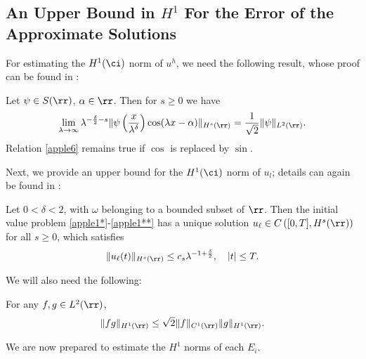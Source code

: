 				 \subsection{An Upper Bound in $H^1$ For the Error of the Approximate
				 Solutions}
         For estimating the $H^1(\ci)$ norm of $u^h$, we need the
				 following result, whose proof can be found in
         \cite{Himonas:2009fk}:
				  \begin{lemma}
					 \label{applea}
					 Let $\psi \in S(\rr)$, $\alpha \in \rr$. Then for $s \ge 0$ we have
					 \begin{equation}
						 \begin{split}
							 \lim_{\lambda \to \infty} \lambda^{-\frac{\delta}{2}-s}
							 \|\psi \left( \frac{x}{\lambda^\delta} \right)\cos(\lambda
							 x - \alpha) \|_{H^s(\rr)} = \frac{1}{\sqrt
							 2}\|\psi\|_{L^2(\rr)}.
							 \label{apple6}
						 \end{split}
					 \end{equation}
					 Relation \eqref{apple6} remains true if $\cos$ is
					 replaced by $\sin$.
				 \end{lemma}
				 Next, we provide an upper bound for the $H^1(\ci)$ norm of
				 $u_l$; details can again be found in
         \cite{Himonas:2009fk}:
				\begin{lemma}
					\label{appleb}
					Let $0<\delta<2$, with $\omega$ belonging to a bounded
					subset of $\rr$. Then the initial value problem
					\eqref{apple1*}-\eqref{apple1**} has a unique solution
					$u_\ell \in C\left( [0,T], H^s(\rr) \right)$ for all $s
					\ge 0$, which 
					satisfies
					\begin{equation}
						\label{apple10'}
						\|u_\ell(t)\|_{H^s(\rr)} \le c_s \lambda^{-1 +
						\frac{\delta}{2}}, \quad |t| \le T.
					\end{equation}
				\end{lemma}
								We will also need the following:
\begin{lemma}
	\label{applec}
	For any $f,g \in L^2(\rr)$,
	\begin{equation*}
		\|fg\|_{H^1(\rr)} \le \sqrt{2} \|f\|_{C^1(\rr)} \|g\|_{H^1(\rr)}.
	\end{equation*}
\end{lemma}
%
We are now prepared to estimate the $H^1$ norms of each $E_i$.
